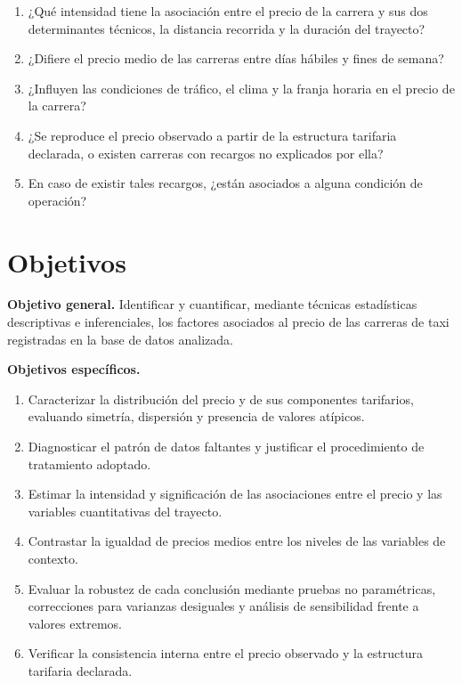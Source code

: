 \documentclass[
]{book}
\providecommand{\tightlist}{%
  \setlength{\itemsep}{0pt}\setlength{\parskip}{0pt}}
\begin{document}
\begin{enumerate}
\def\labelenumi{\arabic{enumi}.}
\tightlist
\item
  ¿Qué intensidad tiene la asociación entre el precio de la carrera y sus dos determinantes
  técnicos, la distancia recorrida y la duración del trayecto?
\item
  ¿Difiere el precio medio de las carreras entre días hábiles y fines de semana?
\item
  ¿Influyen las condiciones de tráfico, el clima y la franja horaria en el precio de la
  carrera?
\item
  ¿Se reproduce el precio observado a partir de la estructura tarifaria declarada, o existen
  carreras con recargos no explicados por ella?
\item
  En caso de existir tales recargos, ¿están asociados a alguna condición de operación?
\end{enumerate}

\section*{Objetivos}\label{objetivos}

\textbf{Objetivo general.} Identificar y cuantificar, mediante técnicas estadísticas descriptivas e
inferenciales, los factores asociados al precio de las carreras de taxi registradas en la base
de datos analizada.

\textbf{Objetivos específicos.}

\begin{enumerate}
\def\labelenumi{\alph{enumi}.}
\tightlist
\item
  Caracterizar la distribución del precio y de sus componentes tarifarios, evaluando
  simetría, dispersión y presencia de valores atípicos.
\item
  Diagnosticar el patrón de datos faltantes y justificar el procedimiento de tratamiento
  adoptado.
\item
  Estimar la intensidad y significación de las asociaciones entre el precio y las variables
  cuantitativas del trayecto.
\item
  Contrastar la igualdad de precios medios entre los niveles de las variables de contexto.
\item
  Evaluar la robustez de cada conclusión mediante pruebas no paramétricas, correcciones para
  varianzas desiguales y análisis de sensibilidad frente a valores extremos.
\item
  Verificar la consistencia interna entre el precio observado y la estructura tarifaria
  declarada.
\end{enumerate}
\end{document}
